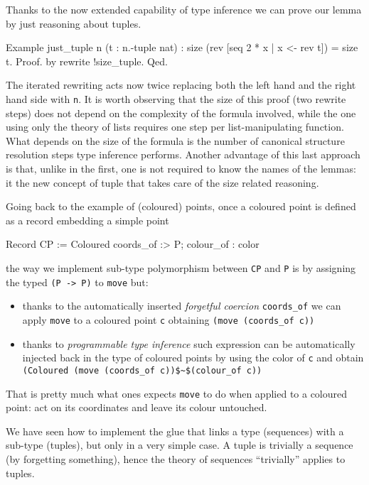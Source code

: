 Thanks to the now extended capability of type inference
we can prove our lemma by just reasoning about tuples.

\begin{coq}{}
Example just_tuple n (t : n.-tuple nat) :
  size (rev [seq 2 * x | x <- rev t]) = size t.
Proof. by rewrite !size_tuple. Qed.
\end{coq}

The iterated rewriting acts now twice replacing both the left hand
and the right hand side with \lstinline/n/.  It is worth observing
that the size of this proof (two rewrite steps) does not depend on the
complexity of the formula involved, while the one using only the
theory of lists requires one step per list-manipulating function.
What depends on the size of the formula is the number of canonical
structure resolution steps type inference performs.  Another advantage
of this last approach is that, unlike in the first, one
is not required to know the names of the lemmas:
it the new concept of tuple that takes care of the size related
reasoning.

Going back to the example of (coloured) points, once a coloured point
is defined as a record embedding a simple point

\begin{coq}{}
Record CP := Coloured { coords_of :> P; colour_of : color }
\end{coq}

\noindent 
the way we implement sub-type polymorphism between \lstinline/CP/
and \lstinline/P/ is by assigning the typed \lstinline/(P -> P)/ to
\lstinline/move/ but:
\begin{itemize}
\item thanks to the automatically inserted 
	\emph{forgetful coercion} \lstinline/coords_of/
	we can apply \lstinline/move/ to a coloured point \lstinline/c/
	obtaining \lstinline/(move (coords_of c))/
\item thanks to \emph{programmable type inference} such	expression
	can be automatically injected back in the type of coloured
	points by using the color of \lstinline/c/ and obtain
	\lstinline/(Coloured (move (coords_of c))$~$(colour_of c))/
\end{itemize}
That is pretty much what ones expects \lstinline/move/ to do when
applied to a coloured point: act on its coordinates and leave
its colour untouched.

We have seen how to implement the glue that links a type (sequences)
with a sub-type (tuples), but only in a very simple case.
A tuple is trivially a sequence (by forgetting something), hence the
theory of sequences ``trivially'' applies to tuples.

